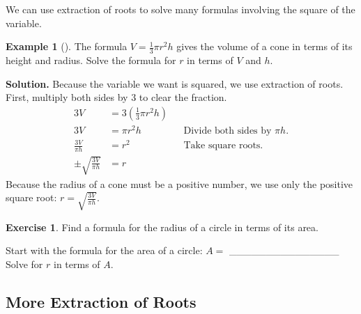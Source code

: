 \documentclass[10pt,]{book}
\theoremstyle{plain}
\theoremstyle{definition}
\newtheorem{exercise}[theorem]{Exercise}
\theoremstyle{definition}
\newtheorem{example}[theorem]{Example}
\numberwithin{equation}{section}
\newcommand{\amp}{ & }
\begin{document}
    We can use extraction of roots to solve many formulas involving the square of the variable.
%
\begin{example}[]\label{example-volume-cone}
The formula \(V = \frac{1}{3} πr^2h\) gives the volume of a cone in terms of its height and radius. Solve the formula for \(r\) in terms of \(V\) and \(h\).
\par\medskip\noindent%
\textbf{Solution.}\quad 
    Because the variable we want is squared, we use extraction of roots. First, multiply both sides by \(3\) to clear the fraction.
    \begin{equation*}
        \begin{align*}
        3V \amp = 3(\frac{1}{3} πr^2h)\\
        3V \amp = πr^2h \amp\amp \text{Divide both sides by } πh.\\
        \frac{3V}{πh}\amp= r^2 \amp\amp \text{Take square roots.}\\
        \pm\sqrt{\frac{3V}{πh}}\amp= r
        \end{align*}
    \end{equation*}
    Because the radius of a cone must be a positive number, we use only the positive square root: 
    \(r = \sqrt{\frac{3V}{πh}}\).
\end{example}
\begin{exercise}\label{exercise-area-circle}
Find a formula for the radius of a circle in terms of its area.%
\par
Start with the formula for the area of a circle: \(A =\) _______________
    Solve for \(r\) in terms of \(A\).%
\end{exercise}
\typeout{************************************************}
\typeout{************************************************}
\subsection[More Extraction of Roots]{More Extraction of Roots}\label{subsection-34}
\end{document}
